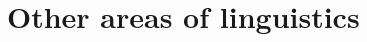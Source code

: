 \documentclass[output=book
		,modfonts
		,nonflat
	        ,collection
	        ,collectionchapter
	        ,collectiontoclongg
 	        ,biblatex  
                ,babelshorthands
                ,newtxmath
                ,draftmode
		  ]{./langsci/langscibook}
\begin{document}
\part{Other areas of linguistics}
%
%



\end{document}
